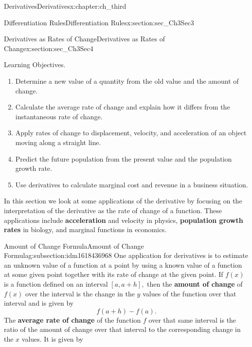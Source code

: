 \documentclass[oneside,10pt,]{book}
\newcommand{\terminology}[1]{\textbf{#1}}
\numberwithin{equation}{section}
\begin{document}
\begin{chapterptx}{Derivatives}{}{Derivatives}{}{}{x:chapter:ch_third}
\begin{sectionptx}{Differentiation Rules}{}{Differentiation Rules}{}{}{x:section:sec_Ch3Sec3}
\end{sectionptx}
%
%
\typeout{************************************************}
\typeout{************************************************}
%
\begin{sectionptx}{Derivatives as Rates of Change}{}{Derivatives as Rates of Change}{}{}{x:section:sec_Ch3Sec4}
\begin{introduction}{Learning Objectives.}%
%
\begin{enumerate}
\item{}Determine a new value of a quantity from the old value and the amount of change.%
\item{}Calculate the average rate of change and explain how it differs from the instantaneous rate of change.%
\item{}Apply rates of change to displacement, velocity, and acceleration of an object moving along a straight line.%
\item{}Predict the future population from the present value and the population growth rate.%
\item{}Use derivatives to calculate marginal cost and revenue in a business situation.%
\end{enumerate}
In this section we look at some applications of the derivative by focusing on the interpretation of the derivative as the rate of change of a function. These applications include \terminology{acceleration} and velocity in physics, \terminology{population growth rates} in biology, and marginal functions in economics.%
\end{introduction}%
%
%
\typeout{************************************************}
\typeout{************************************************}
%
\begin{subsectionptx}{Amount of Change Formula}{}{Amount of Change Formula}{}{}{g:subsection:idm1618436968}
One application for derivatives is to estimate an unknown value of a function at a point by using a known value of a function at some given point together with its rate of change at the given point. If \(f(x)\) is a function defined on an interval \([a,a+h],\) then the \terminology{amount of change} of \(f(x)\) over the interval is the change in the \(y\) values of the function over that interval and is given by%
%
\begin{equation*}
f(a+h)-f(a).
\end{equation*}
The \terminology{average rate of change} of the function \(f\) over that same interval is the ratio of the amount of change over that interval to the corresponding change in the \(x\) values. It is given by%

\end{subsectionptx}
\end{sectionptx}
\end{chapterptx}
\end{document}
